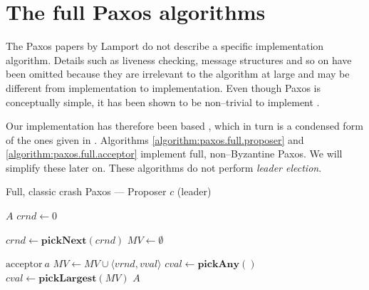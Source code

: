 \section{The full Paxos algorithms}

The Paxos papers by Lamport \cite{Lamport:1998:PP:279227.279229,Lam01}
do not describe a specific implementation algorithm.
Details such as liveness checking, message structures and so on have
been omitted because they are irrelevant to the algorithm at large and may be
different from implementation to implementation.  Even though Paxos
is conceptually simple, it has been shown to be non--trivial to implement
\cite{Chandra:2007:PML:1281100.1281103}.

Our implementation has therefore been based 
\cite{Insane.Paxos}, which in turn is a condensed form of the ones given in 
\cite{renesse.paxos,Lam01}.
%
Algorithms \ref{algorithm:paxos.full.proposer} and
\ref{algorithm:paxos.full.acceptor} implement full, non--Byzantine Paxos.
We will simplify these later on.  These algorithms do not perform \textit{leader
election}.

\begin{algorithm}
  \caption{Full, classic crash Paxos --- Proposer $c$ (leader)}
  \label{algorithm:paxos.full.proposer}
  \begin{algorithmic}

    \State $A$ 
    \State $crnd \gets 0$ 
    \State

      \State $crnd \gets \textbf{pickNext}(crnd)$ 
      \State $MV \gets \emptyset$ 
      \State {}
    \EndOn
    \State

       {$\text{acceptor}\ a$} 
        \State $MV \gets MV \cup \langle vrnd, vval \rangle$
            \State $cval \gets \textbf{pickAny}()$
          \Else
            \State $cval \gets \textbf{pickLargest}(MV)$
          \EndIf
         \State {}
                       {$A$}
        \EndIf
      \EndIf
    \EndOn

  \end{algorithmic}
\end{algorithm}

